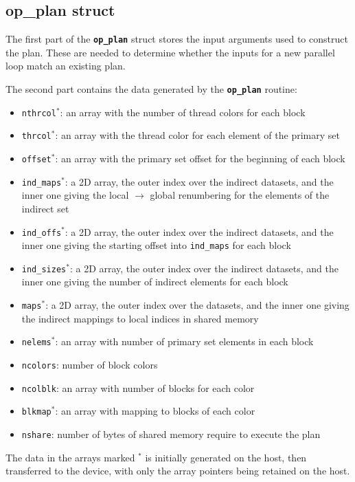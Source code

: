 \documentclass[12pt]{article}
\begin{document}
\subsection{op\_plan struct}

The first part of the {\tt \bf op\_plan} struct stores the input arguments
used to construct the plan. These are needed to determine whether the inputs 
for a new parallel loop match an existing plan.

The second part contains the data generated by the {\tt \bf op\_plan} routine:
\begin{itemize}
\item {\tt nthrcol${}^*$}:
an array with the number of thread colors for each block
\item {\tt thrcol${}^*$}:
an array with the thread color for each element of the primary set
\item {\tt offset${}^*$}:
an array with the primary set offset for the beginning of each block
\item {\tt ind\_maps${}^*$}:
a 2D array, the outer index over the indirect datasets, and the inner one giving the 
local $\rightarrow$ global renumbering for the elements of the indirect set
\item {\tt ind\_offs${}^*$}:
a 2D array, the outer index over the indirect datasets, and the inner one giving the 
starting offset into {\tt ind\_maps} for each block
\item {\tt ind\_sizes${}^*$}:
a 2D array, the outer index over the indirect datasets, and the inner one giving the
number of indirect elements for each block
\item {\tt maps${}^*$}:
a 2D array, the outer index over the datasets, and the inner one giving the indirect 
mappings to local indices in shared memory
\item {\tt nelems${}^*$}:
an array with number of primary set elements in each block
\item {\tt ncolors}:
number of block colors
\item {\tt ncolblk}:
an array with number of blocks for each color
\item {\tt blkmap${}^*$}:
an array with mapping to blocks of each color
\item {\tt nshare}:
number of bytes of shared memory require to execute the plan
\end{itemize}

The data in the arrays marked ${}^*$ is initially generated on the host, then 
transferred to the device, with only the array pointers being retained on the host.
\end{document}
